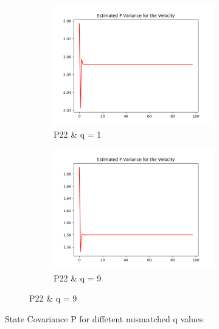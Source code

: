 \documentclass{article}
\begin{document}
\begin{figure}[H]
\begin{subfigure} {1\textwidth}
\begin{subfigure}{.3\textwidth}
                    \includegraphics[width=1\linewidth]{./img/p22_q3.png}
                    \caption{P22 \& q = 1 }
                \end{subfigure}
                \begin{subfigure}{.3\textwidth}
                    \includegraphics[width=1\linewidth]{./img/p22_qf2.png}
                    \caption{P22 \& q = 9 }
                \end{subfigure}
            \end{subfigure} 
            \caption{State Covariance P for diffetent mismatched q values}
            \label{fig:variancesmis}
        \end{figure}
\end{document}
